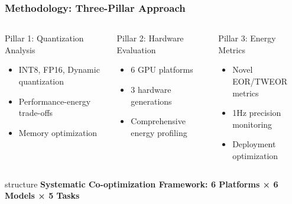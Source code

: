 \documentclass[aspectratio=169,xcolor=dvipsnames]{beamer}
\begin{document}
\begin{frame}
\frametitle{Methodology: Three-Pillar Approach}

\begin{columns}[c]
\begin{block}{Pillar 1: Quantization Analysis}
\begin{center}
\begin{itemize}
\item INT8, FP16, Dynamic quantization
\item Performance-energy trade-offs
\item Memory optimization
\end{itemize}
\end{center}
\end{block}

\begin{block}{Pillar 2: Hardware Evaluation}
\begin{center}
\begin{itemize}
\item 6 GPU platforms
\item 3 hardware generations
\item Comprehensive energy profiling
\end{itemize}
\end{center}
\end{block}

\begin{block}{Pillar 3: Energy Metrics}
\begin{center}
\begin{itemize}
\item Novel EOR/TWEOR metrics
\item 1Hz precision monitoring
\item Deployment optimization
\end{itemize}
\end{center}
\end{block}

\end{columns}

\vspace{0.8cm}
\begin{center}
\begin{beamercolorbox}[wd=0.9\textwidth,center]{structure}
\textbf{Systematic Co-optimization Framework: 6 Platforms × 6 Models × 5 Tasks}
\end{beamercolorbox}
\end{center}
\end{frame}
\end{document}
